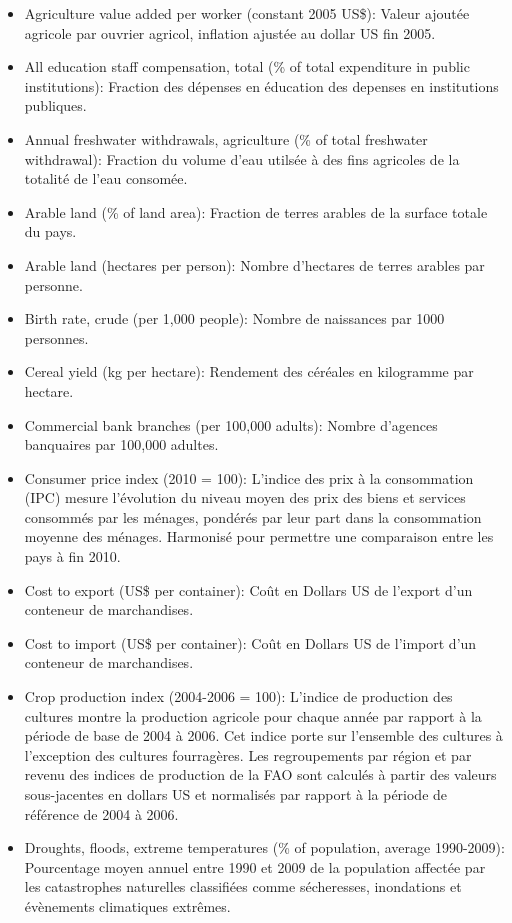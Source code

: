 \begin{itemize}
	\item Agriculture value added per worker (constant 2005 US\$): Valeur ajoutée agricole par ouvrier agricol, inflation ajustée au dollar US fin 2005.
	\item All education staff compensation, total (\% of total expenditure in public institutions): Fraction des dépenses en éducation des depenses en institutions publiques.
	\item Annual freshwater withdrawals, agriculture (\% of total freshwater withdrawal): Fraction du volume d'eau utilsée à des fins agricoles de la totalité de l'eau consomée.
	\item Arable land (\% of land area): Fraction de terres arables de la surface totale du pays.
	\item Arable land (hectares per person): Nombre d'hectares de terres arables par personne.
	\item Birth rate, crude (per 1,000 people): Nombre de naissances par 1000 personnes.
	\item Cereal yield (kg per hectare): Rendement des céréales en kilogramme par hectare.
	\item Commercial bank branches (per 100,000 adults): Nombre d'agences banquaires par 100,000 adultes.
	\item Consumer price index (2010 = 100): L'indice des prix à la consommation (IPC) mesure l'évolution du niveau moyen des prix des biens et services consommés par les ménages, pondérés par leur part dans la consommation moyenne des ménages. Harmonisé pour permettre une comparaison entre les pays à fin 2010.
	\item Cost to export (US\$ per container): Coût en Dollars US de l'export d'un conteneur de marchandises.
	\item Cost to import (US\$ per container): Coût en Dollars US de l'import d'un conteneur de marchandises.
	\item Crop production index (2004-2006 = 100): 
	L'indice de production des cultures montre la production agricole pour chaque année par rapport à la période de base de 2004 à 2006. Cet indice porte sur l'ensemble des cultures à l'exception des cultures fourragères. Les regroupements par région et par revenu des indices de production de la FAO sont calculés à partir des valeurs sous-jacentes en dollars US et normalisés par rapport à la période de référence de 2004 à 2006.
	\item Droughts, floods, extreme temperatures (\% of population, average 1990-2009): Pourcentage moyen annuel entre 1990 et 2009 de la population affectée par les catastrophes naturelles classifiées comme sécheresses, inondations et évènements climatiques extrêmes.

\end{itemize}
